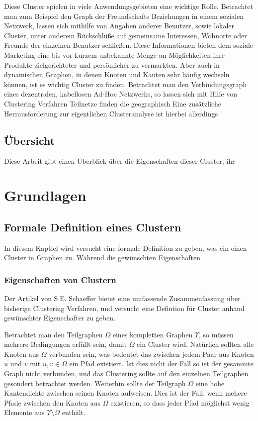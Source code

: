 \documentclass[journal]{vgtc}
\begin{document}
  Diese Cluster spielen in viele Anwendungsgebieten eine wichtige Rolle. 
  Betrachtet man zum Beispiel den Graph der Freundschafts Beziehungen in einem sozialen Netzwerk,
  lassen sich mithilfe von Angaben anderer Benutzer, sowie lokaler Cluster, unter anderem Rückschlüße 
  auf gemeinsame Interessen, Wohnorte oder Freunde der einzelnen Benutzer schließen.
  Diese Informationen bieten dem soziale Marketing eine bis vor kurzem unbekannte Menge
  an Möglichkeiten ihre Produkte zielgerichteter und persönlicher zu vermarkten.
  Aber auch in dynamischen Graphen, in denen Knoten und Kanten sehr häufig wechseln können,
  ist es wichtig Cluster zu finden. Betrachtet man den Verbindungsgraph eines dezentralen, 
  kabellosen Ad-Hoc Netzwerks, so lassen sich mit Hilfe von Clustering Verfahren 
  Teilnetze finden die geographisch
  Eine zusätzliche Herrausforderung zur eigentlichen Clusteranalyse ist hierbei allerdings
  
  \subsection*{Übersicht}
  Diese Arbeit gibt einen Überblick über die Eigenschaften dieser Cluster, ihr

\section{Grundlagen}
  
  \subsection{Formale Definition eines Clustern}
  In diesem Kaptiel wird versucht eine formale Definition zu geben, was ein einen Cluster in Graphen zu. 
  Während die gewünschten Eigenschaften
  
  \subsubsection{Eigenschaften von Clustern}
  \label{sec:properties} 
  Der Artikel von S.E. Schaeffer \cite{Schaeffer} bietet eine umfassende Zusammenfassung
  über bisherige Clustering Verfahren, und versucht eine Defintion für 
  Cluster anhand gewünschter Eigenschafter zu geben.
  
  Betrachtet man den Teilgraphen $\Omega$ eines kompletten Graphen $\Upsilon$, so müssen
  mehrere Bedingungen erfüllt sein, damit $\Omega$ ein Cluster wird.
  Natürlich sollten alle Knoten aus $\Omega$ verbunden sein, was bedeutet das 
  zwischen jedem Paar aus Knoten $u$ und $v$ mit $u,v \in \Omega$ ein Pfad existiert. 
  Ist dies nicht der Fall so ist der gesammte Graph nicht verbunden, und das 
  Clustering sollte auf den einzelnen Teilgraphen gesondert betrachtet werden.
  Weiterhin sollte der Teilgraph $\Omega$ eine hohe Kantendichte zwischen seinen Knoten
  aufweisen. Dies ist der Fall, wenn mehere Pfade zwischen den Knoten aus $\Omega$ existieren,
  so dass jeder Pfad möglichst wenig Elemente aus $\Upsilon \setminus \Omega$ enthält.
  
\end{document}
